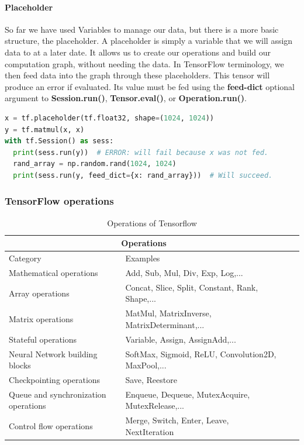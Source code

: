 \paragraph{Placeholder}
So far we have used Variables to manage our data, but there is a more basic structure, the placeholder. A placeholder is simply a variable that we will assign data to at a later date. It allows us to create our operations and build our computation graph, without needing the data. In TensorFlow terminology, we then feed data into the graph through these placeholders.
This tensor will produce an error if evaluated. Its value must be fed using the \textbf{feed-dict} optional argument to \textbf{Session.run()}, \textbf{Tensor.eval()}, or \textbf{Operation.run()}.
\begin{lstlisting}[language=Python]
x = tf.placeholder(tf.float32, shape=(1024, 1024))
y = tf.matmul(x, x)
with tf.Session() as sess:
  print(sess.run(y))  # ERROR: will fail because x was not fed.
  rand_array = np.random.rand(1024, 1024)
  print(sess.run(y, feed_dict={x: rand_array}))  # Will succeed.
\end{lstlisting}
    \subsubsection{TensorFlow operations}
    
    \begin{table}[H] \centering  

\begin{tabular}{ |p{7cm}||p{9cm} |p{3cm}|p{3cm}| }
 \hline
 \multicolumn{2}{|c|}{Operations} \\
 \hline
 
 Category & Examples \\
 \hline
 Mathematical operations & Add, Sub, Mul, Div, Exp, Log,...\\
 Array operations & Concat, Slice, Split, Constant, Rank, Shape,...\\
 Matrix operations & MatMul, MatrixInverse, MatrixDeterminant,...\\
 Stateful operations & Variable, Assign, AssignAdd,...\\
 Neural Network building blocks & SoftMax, Sigmoid, ReLU, Convolution2D, MaxPool,...\\
 Checkpointing operations & Save, Reestore\\
 Queue and synchronization operations & Enqueue, Dequeue, MutexAcquire, MutexRelease,...\\
 Control flow operations & Merge, Switch, Enter, Leave, NextIteration\\
 
 
 \hline
 
\end{tabular}
\caption{Operations of Tensorflow \cite{web010}}
\label{table:1}

\end{table}

